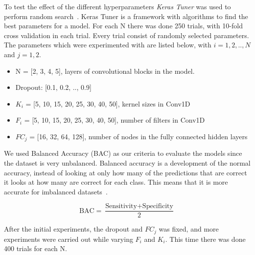To test the effect of the different hyperparameters \textit{Keras Tuner} was used to perform random search~\cite{omalley2019kerastuner}. Keras Tuner is a framework with algorithms to find the best parameters for a model. For each N there was done 250 trials, with 10-fold cross validation in each trial. Every trial consist of randomly selected parameters. The parameters which were experimented with are listed below, with $i = 1,2,..,N$ and $j = 1,2$.

\begin{itemize}
    \item N = [2, 3, 4, 5], layers of convolutional blocks in the model.
    \item Dropout: [0.1, 0.2, .., 0.9]
    \item $K_i$ = [5, 10, 15, 20, 25, 30, 40, 50], kernel sizes in Conv1D
    \item $F_i$ = [5, 10, 15, 20, 25, 30, 40, 50], number of filters in Conv1D
    \item $FC_j$ = [16, 32, 64, 128], number of nodes in the fully connected hidden layers 
\end{itemize}

We used Balanced Accuracy (BAC) as our criteria to evaluate the models since the dataset is very unbalanced. Balanced accuracy is a development of the normal accuracy, instead of looking at only how many of the predictions that are correct it looks at how many are correct for each class. This means that it is more accurate for imbalanced datasets~\cite{accuracy}.

$$
\text{BAC} = \frac{\text{Sensitivity} + \text{Specificity}}{2}
$$

After the initial experiments, the dropout and $FC_j$ was fixed, and more experiments were carried out while varying $F_i$ and $K_i$. This time there was done 400 trials for each N.